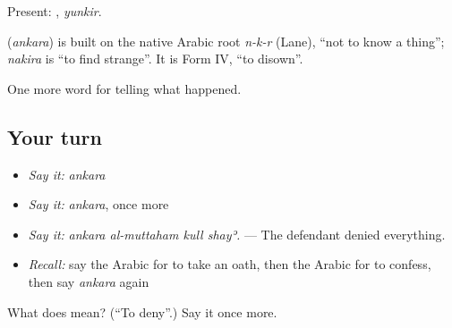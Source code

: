 Present: , \emph{yunkir}.

\begin{cousinweb}
\textbf{} (\emph{ankara}) is built on the native Arabic root \emph{n-k-r} (Lane), \textquotedblleft{}not to know a thing\textquotedblright{}; \emph{nakira} is \textquotedblleft{}to find strange\textquotedblright{}. It is Form IV, \textquotedblleft{}to disown\textquotedblright{}.
\end{cousinweb}

\begin{grammarlens}[title={What you've built}]
One more word for telling what happened.
\end{grammarlens}

\subsection*{Your turn}
\begin{itemize}
\raggedright
  \item \emph{Say it:} \emph{ankara}
  \item \emph{Say it:} \emph{ankara}, once more
  \item \emph{Say it:} \emph{ankara al-muttaham kull shayʾ.} — The defendant denied everything.
  \item \emph{Recall:} say the Arabic for to take an oath, then the Arabic for to confess, then say \emph{ankara} again
\end{itemize}

\begin{tcolorbox}[breakable,colback=teal!4,colframe=teal!35!black,title={Before you move on}]
What does  mean? (\textquotedblleft{}To deny\textquotedblright{}.) Say it once more.
\end{tcolorbox}
